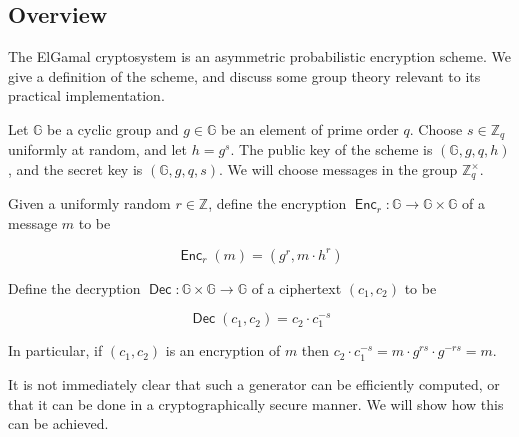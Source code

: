 \documentclass[11pt,twoside,a4paper]{article}
\DeclareMathOperator{\Enc}{\mathsf{Enc}}
\DeclareMathOperator{\Dec}{\mathsf{Dec}}
\theoremstyle{definition}
\begin{document}
\subsection{Overview}
The ElGamal cryptosystem is an asymmetric probabilistic encryption scheme. We give a definition of the scheme, and discuss some group theory relevant to its practical implementation.
\begin{definition}
    Let \(\mathbb{G}\) be a cyclic group and \(g\in\mathbb{G}\) be an element of prime order \(q\). Choose \(s\in\mathbb{Z}_q\) uniformly at random, and let \(h=g^s\). The public key of the scheme is \((\mathbb{G}, g, q, h)\), and the secret key is \((\mathbb{G}, g, q, s)\). We will choose messages in the group \(\mathbb{Z}^\times_q\).

    Given a uniformly random \(r\in\mathbb{Z}\), define the encryption \(\Enc_r:\mathbb{G}\rightarrow\mathbb{G}\times\mathbb{G}\) of a message \(m\) to be
    
    \[\Enc_r(m) = (g^r, m\cdot h^r)\]

    Define the decryption \(\Dec:\mathbb{G}\times\mathbb{G}\rightarrow \mathbb{G}\) of a ciphertext \((c_1, c_2)\) to be
    
    \[\Dec(c_1,c_2)=c_2\cdot c_1^{-s}\]

    In particular, if \((c_1,c_2)\) is an encryption of \(m\) then \(c_2\cdot c_1^{-s}=m\cdot g^{rs}\cdot g^{-rs}=m\).
\end{definition}
It is not immediately clear that such a generator can be efficiently computed, or that it can be done in a cryptographically secure manner. We will show how this can be achieved.
\end{document}
